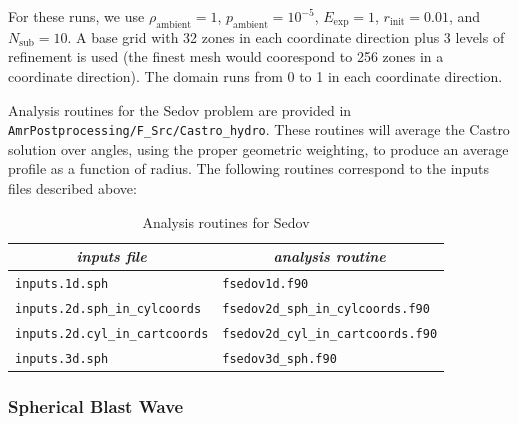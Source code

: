 For these runs, we use $\rho_\mathrm{ambient} = 1$,
$p_\mathrm{ambient} = 10^{-5}$, $E_\mathrm{exp} = 1$, $r_\mathrm{init}
 = 0.01$, and $N_\mathrm{sub} = 10$.  A base grid with 32 zones in each
coordinate direction plus 3 levels of refinement is used (the finest
mesh would coorespond to 256 zones in a coordinate direction).  The
domain runs from 0 to 1 in each coordinate direction.




Analysis routines for the Sedov problem are provided in
{\tt AmrPostprocessing/F_Src/Castro\_hydro}.  These routines will
average the Castro solution over angles, using the proper geometric
weighting, to produce an average profile as a function of radius.
The following routines correspond to the inputs files described above:
\begin{table}[h]
\centering
{\small
\begin{tabular}{|l|l|} \hline
\multicolumn{1}{|c}{\em inputs file} &  \multicolumn{1}{|c|}{\em analysis routine} \\
\hline
{\tt inputs.1d.sph} & {\tt fsedov1d.f90} \\
%
{\tt inputs.2d.sph\_in\_cylcoords} & {\tt fsedov2d\_sph\_in\_cylcoords.f90} \\
%
{\tt inputs.2d.cyl\_in\_cartcoords} & {\tt fsedov2d\_cyl\_in\_cartcoords.f90} \\
%
{\tt inputs.3d.sph} & {\tt fsedov3d\_sph.f90} \\
\hline
\end{tabular}
} %
\caption{\label{table:fsedov} Analysis routines for Sedov}
\end{table}

\subsubsection{Spherical Blast Wave}

